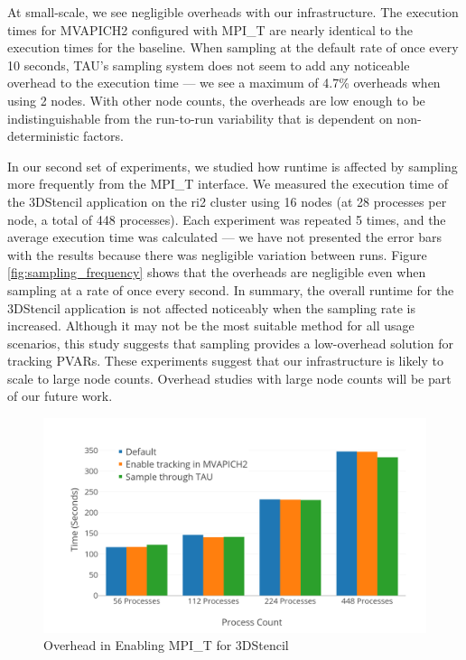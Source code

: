 \par At small-scale, we see negligible overheads with our infrastructure. The execution times for MVAPICH2 configured with MPI\_T are nearly identical to the execution times for the baseline. When sampling at the default rate of once every 10 seconds, TAU's sampling system does not seem to add any noticeable overhead to the execution time --- we see a maximum of 4.7\% overheads when using 2 nodes. With other node counts, the overheads are low enough to be indistinguishable from the run-to-run variability that is dependent on non-deterministic factors.\par In our second set of experiments, we studied how runtime is affected by sampling more frequently from the MPI\_T interface. We measured the execution time of the 3DStencil application on the ri2 cluster using 16 nodes (at 28 processes per node, a total of 448 processes). Each experiment was repeated 5 times, and the average execution time was calculated --- we have not presented the error bars with the results because there was negligible variation between runs. Figure \ref{fig:sampling_frequency} shows that the overheads are negligible even when sampling at a rate of once every second. In summary, the overall runtime for the 3DStencil application is not affected noticeably when the sampling rate is increased. Although it may not be the most suitable method for all usage scenarios, this study suggests that sampling provides a low-overhead solution for tracking PVARs. These experiments suggest that our infrastructure is likely to scale to large node counts. Overhead studies with large node counts will be part of our future work.
\begin{center}
        \begin{figure}[tbp!]
                 \includegraphics[width=\columnwidth,keepaspectratio,scale=1.0]{figures/MPI_T_Overheads}
                \captionsetup{justification=centering}
                  \caption{Overhead in Enabling MPI\_T for 3DStencil}
                   \label{fig:overheads}
        \end{figure}
\end{center}


